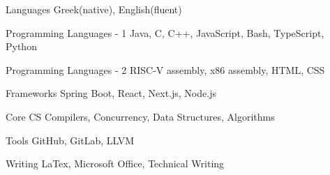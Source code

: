 

\begin{cvskills}

  \cvskill
    {Languages} %
    {Greek(native), English(fluent)} %

  \cvskill
    {Programming Languages - 1} %
    {Java, C, C++, JavaScript, Bash, TypeScript, Python} %

  \cvskill
    {Programming Languages - 2} %
    {RISC-V assembly, x86 assembly, HTML, CSS} %

  \cvskill
    {Frameworks} %
    {Spring Boot, React, Next.js, Node.js} %

  \cvskill
    {Core CS} %
    {Compilers, Concurrency, Data Structures, Algorithms} %

  \cvskill
    {Tools} %
    {GitHub, GitLab, LLVM} %

  \cvskill
    {Writing} %
    {LaTex, Microsoft Office, Technical Writing} %

\end{cvskills}
